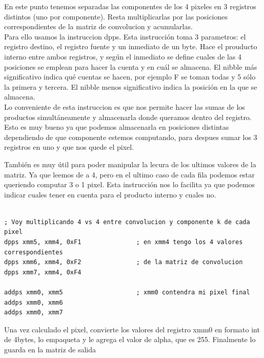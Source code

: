 \documentclass[10pt,a4paper,spanish]{article}
\begin{document}
En este punto tenemos separadas las componentes de los 4 pixeles en 3 registros distintos (uno por componente). Resta multiplicarlas por las posiciones correspondientes de la matriz de convolucion y acumularlas. \\

Para ello usamos la instruccion dpps. Esta instrucción toma 3 parametros: el registro destino, el registro fuente y un inmediato de un byte. Hace el prouducto interno entre ambos registros, y según el inmediato se define cuales de las 4 posiciones se emplean para hacer la cuenta y en cuál se almacena. El nibble más significativo indica qué cuentas se hacen, por ejemplo F se toman todas y 5 sólo la primera y tercera. El nibble menos significativo indica la posición en la que se almacena. \\

Lo conveniente de esta instruccion es que nos permite hacer las sumas de los productos simultáneamente y almacenarla donde queramos dentro del registro. Esto es muy bueno ya que podemos almacenarla en posiciones distintas dependiendo de que componente estemos computando, para despues sumar los 3 registros en uno y que nos quede el pixel.

También es muy útil para poder manipular la lecura de los ultimos valores de la matriz. Ya que leemos de a 4, pero en el ultimo caso de cada fila podemos estar queriendo computar 3 o 1 pixel. Esta instrucción nos lo facilita ya que podemos indicar cuales tener en cuenta para el producto interno y cuales no. \\

\begin{codesnippet}
\begin{verbatim}

; Voy multiplicando 4 vs 4 entre convolucion y componente k de cada pixel
dpps xmm5, xmm4, 0xF1               ; en xmm4 tengo los 4 valores correspondientes
dpps xmm6, xmm4, 0xF2               ; de la matriz de convolucion
dpps xmm7, xmm4, 0xF4

addps xmm0, xmm5                    ; xmm0 contendra mi pixel final
addps xmm0, xmm6
addps xmm0, xmm7

\end{verbatim}
\end{codesnippet}

Una vez calculado el pixel, convierte los valores del registro xmm0 en formato int de 4bytes, lo empaqueta y le agrega el valor de alpha, que es 255. Finalmente lo guarda en la matriz de salida
\end{document}
